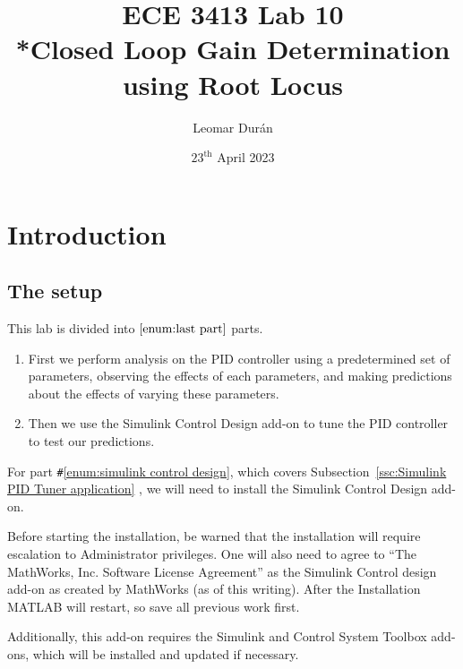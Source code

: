 \documentclass[12pt]{article}
\title{ECE 3413 Lab 10\\*Closed Loop Gain Determination using Root Locus}
\author{Leomar Dur\'an}
\date{${23}^{\text{th}}$ April 2023}
\begin{document}
\maketitle
\newpage

\section{Introduction}\label{sec:intro}

\subsection{The setup}\label{ssc:the setup}

This lab is divided into $\ref{enum:last part}$ parts.
\begin{enumerate}
    \item
        First we perform analysis on the PID controller using a predetermined set of parameters,
        observing the effects of each parameters,
        and making predictions about the effects of varying these parameters.
    \item\label{enum:simulink control design}
        Then we use the Simulink Control Design add-on to tune the PID controller to test our predictions.
    \label{enum:last part}
\end{enumerate}

For part \verb|#|\ref{enum:simulink control design},
which covers Subsection~\ref{ssc:Simulink PID Tuner application} ,
we will need to install the Simulink Control Design add-on.

Before starting the installation,
be warned that the installation will require escalation to Administrator privileges.
One will also need to agree to ``The MathWorks, Inc. Software License Agreement''
as the Simulink Control design add-on as created by MathWorks%
{} (as of this writing).
After the Installation MATLAB will restart,
so save all previous work first.

Additionally,
this add-on requires the Simulink and Control System Toolbox add-ons,
which will be installed and updated if necessary.
\end{document}
